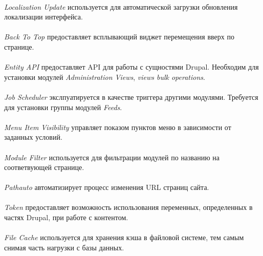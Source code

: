 \paragraph{}
\textit{Localization Update} используется для автоматической загрузки обновления
локализации интерфейса.

\paragraph{}
\textit{Back To Top} предоставляет всплывающий виджет перемещения вверх по странице.

\paragraph{}
\textit{Entity API} предоставляет API для работы с сущностями Drupal.
Необходим для установки модулей \textit{Administration Views},
\textit{views bulk operations}.

\paragraph{}
\textit{Job Scheduler} экслпуатируется в качестве триггера другими модулями.
Требуется для установки группы модулей \textit{Feeds}.

\paragraph{}
\textit{Menu Item Visibility} управляет показом пунктов меню в зависимости от заданных условий.

\paragraph{}
\textit{Module Filter} используется для фильтрации модулей по названию на соответвующей странице.

\paragraph{}
\textit{Pathauto} автоматизирует процесс изменения URL страниц сайта.

\paragraph{}
\textit{Token} предоставляет возможность использования переменных,
определенных в частях Drupal, при работе с контентом.

\paragraph{}
\textit{File Cache} используется для хранения кэша в файловой системе,
тем самым снимая часть нагрузки с базы данных.

